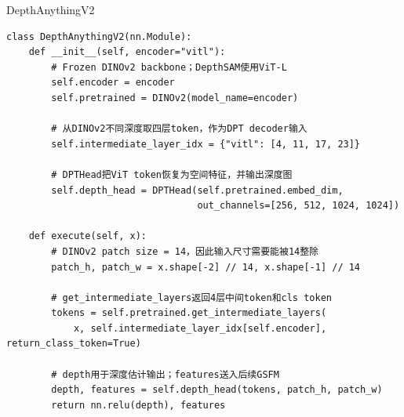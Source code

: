 \begin{frame}[fragile]{DepthAnythingV2}
\begin{lstlisting}[style=pythoncode,basicstyle=\ttfamily\tiny]
class DepthAnythingV2(nn.Module):
    def __init__(self, encoder="vitl"):
        # Frozen DINOv2 backbone；DepthSAM使用ViT-L
        self.encoder = encoder
        self.pretrained = DINOv2(model_name=encoder)

        # 从DINOv2不同深度取四层token，作为DPT decoder输入
        self.intermediate_layer_idx = {"vitl": [4, 11, 17, 23]}

        # DPTHead把ViT token恢复为空间特征，并输出深度图
        self.depth_head = DPTHead(self.pretrained.embed_dim,
                                  out_channels=[256, 512, 1024, 1024])

    def execute(self, x):
        # DINOv2 patch size = 14，因此输入尺寸需要能被14整除
        patch_h, patch_w = x.shape[-2] // 14, x.shape[-1] // 14

        # get_intermediate_layers返回4层中间token和cls token
        tokens = self.pretrained.get_intermediate_layers(
            x, self.intermediate_layer_idx[self.encoder], return_class_token=True)

        # depth用于深度估计输出；features送入后续GSFM
        depth, features = self.depth_head(tokens, patch_h, patch_w)
        return nn.relu(depth), features
\end{lstlisting}
\end{frame}

